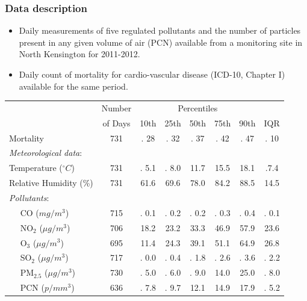 \documentclass[slidestop,compress,serif,10pt]{beamer}
\begin{document}
\begin{frame}
\frametitle{Data description}
\begin{itemize}
\item Daily measurements of five regulated pollutants and the number of particles present in any given volume of air (PCN) available from a monitoring site in North Kensington for 2011-2012.
\item Daily count of mortality for cardio-vascular disease (ICD-10, Chapter I) available for the same period.

\end{itemize}
\begin{footnotesize}
\begin{tabular}{|l|c|ccccc|c|}
\hline
& Number & \multicolumn{5}{c|}{Percentiles} & \\
& of Days & 10th & 25th & 50th & 75th & 90th  & IQR\\
\hline
Mortality & 731 & {\color{white}.} 28 & {\color{white}.}  32 & {\color{white}.}  37 & {\color{white}.}  42 & {\color{white}.}  47 & {\color{white}.}  10\\
\emph{Meteorological data}: & & & & & & & \\
Temperature ($^\circ C$) & 731 & {\color{white}.} 5.1 & {\color{white}.} 8.0 & 11.7 & 15.5 & 18.1 & {\color{white}.}7.4\\
Relative Humidity (\%) & 731 & 61.6 & 69.6& 78.0& 84.2 &88.5 & 14.5\\
\emph{Pollutants}: & & & & & & & \\
$\quad$ CO ($mg/m^3$) & 715 & {\color{white}.} 0.1 &{\color{white}.} 0.2 & {\color{white}.} 0.2 & {\color{white}.} 0.3& {\color{white}.} 0.4& {\color{white}.} 0.1\\
$\quad$ NO$_2$ ($\mu g/m^3$) & 706 & 18.2 & 23.2& 33.3 & 46.9 & 57.9 & 23.6\\
$\quad$ O$_3$ ($\mu g/m^3$) & 695 & 11.4 & 24.3 & 39.1 & 51.1 & 64.9 & 26.8\\
$\quad$ SO$_2$ ($\mu g/m^3$) & 717 & {\color{white}.} 0.0 & {\color{white}.} 0.4 & {\color{white}.} 1.8 & {\color{white}.} 2.6 & {\color{white}.} 3.6 & {\color{white}.} 2.2\\
$\quad$ PM$_{2.5}$ ($\mu g/m^3$) & 730 &  {\color{white}.} 5.0  & {\color{white}.} 6.0  & {\color{white}.} 9.0 & 14.0  &25.0 & {\color{white}.} 8.0\\
$\quad$ PCN ($p/mm^3$)& 636& {\color{white}.} 7.8 & {\color{white}.} 9.7 &12.1& 14.9 & 17.9 & {\color{white}.} 5.2 \\
\hline
\end{tabular}\end{footnotesize}

\end{frame}
\end{document}
